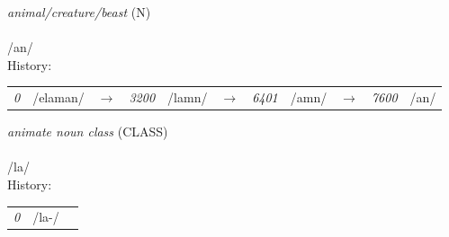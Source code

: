 \vspace{15pt}
\begin{nopagebreak}
 \textit{animal/creature/beast} (N)\\
\\
\noindent /{}{\textprimstress}an/\\


\noindent History:

\vspace{-0pt}
\hspace{40pt}
\begin{tabular}{ccc}
\textit{0} & /{}elaman/&$\rightarrow$ & \textit{3200} & /{}lamn/&$\rightarrow$ & \textit{6401} & /{}amn/&$\rightarrow$ & \textit{7600} & /{}an/& \\
\end{tabular}

\vspace{20pt}\hline

\end{nopagebreak}
\filbreak



\vspace{15pt}
\begin{nopagebreak}
 \textit{animate noun class} (CLASS)\\
\\
\noindent /l{\textprimstress}a/\\


\noindent History:

\vspace{-0pt}
\hspace{40pt}
\begin{tabular}{ccc}
\textit{0} & /la-/& \\
\end{tabular}

\vspace{20pt}\hline

\end{nopagebreak}
\filbreak



